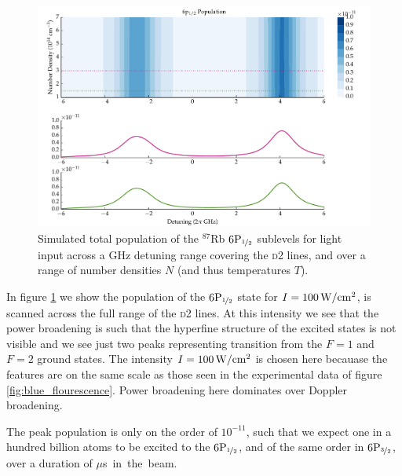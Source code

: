     \begin{figure}[]
    \includegraphics[width=\linewidth]
        {figs/05_twophoton/rb87_5spd6p_hf_solve_scan_f01_fig2.pdf}
    \caption{
    Simulated total population of the $^{87}$Rb
    $6\rm{P}_{\nicefrac{1}{2}}$ sublevels for light input across a GHz detuning
    range covering the \textsc{d2} lines, and over a range of number densities
    $N$ (and thus temperatures $T$).
    }
    \label{fig:blue_plot_model} 
    \end{figure}

    In figure \ref{fig:blue_plot_model} we show the population of the
    $6\rm{P}_{\nicefrac{1}{2}}$ state for $I = \unit[100]{W/cm^2}$, is scanned
    across the full range of the \textsc{d2} lines. At this intensity we see
    that the power broadening is such that the hyperfine structure of the
    excited states is not visible and we see just two peaks representing
    transition from the $F = 1$ and $F = 2$ ground states. The intensity $I =
    \unit[100]{W/cm^2}$ is chosen here becauase the features are on the same
    scale as those seen in the experimental data of figure
    \ref{fig:blue_flourescence}. Power broadening here dominates over Doppler
    broadening.

    The peak population is only on the order of $10^{-11}$, such that we expect
    one in a hundred billion atoms to be excited to the
    $6\rm{P}_{\nicefrac{1}{2}}$, and of the same order in
    $6\rm{P}_{\nicefrac{3}{2}}$, over a duration of \unit[2]{$\mu$s} in the
    beam.
